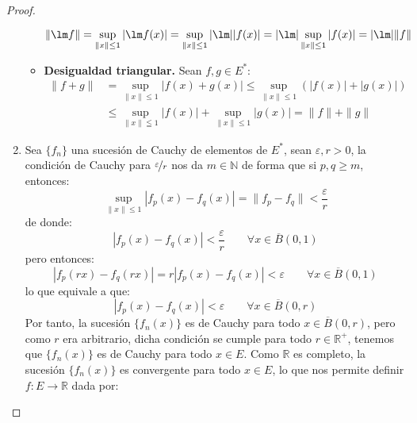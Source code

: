 \begin{prop}
\begin{proof}
\begin{enumerate}
\begin{itemize}
                        \begin{equation*}
                            \|\lm f\| = \sup_{\|x\|\leq 1} |\lm f(x)|  = \sup_{\|x\|\leq 1} |\lm||f(x)| = |\lm| \sup_{\|x\|\leq 1}|f(x)| = |\lm| \|f\|
                        \end{equation*}
                    \item \textbf{Desigualdad triangular.} Sean $f,g\in E^\ast$:
                        \begin{align*}
                            \|f+g\| &= \sup_{\|x\|\leq 1}|f(x) + g(x)| \leq \sup_{\|x\|\leq 1} (|f(x)| + |g(x)|) \\ &\leq \sup_{\|x\|\leqq 1}|f(x)| + \sup_{\|x\|\leq 1} |g(x)| = \|f\| + \|g\|
                        \end{align*}
                \end{itemize}
            \item Sea $\{f_n\}$ una sucesión de Cauchy de elementos de $E^\ast$, sean $\varepsilon,r>0$, la condición de Cauchy para $\nicefrac{\varepsilon}{r}$ nos da $m\in \mathbb{N}$ de forma que si $p,q\geq m$, entonces:
                \begin{equation*}
                    \sup_{\|x\|\leq 1} |f_p(x) - f_q(x)| = \|f_p - f_q\| < \dfrac{\varepsilon}{r}
                \end{equation*}
                de donde:
                \begin{equation*}
                    |f_p(x) - f_q(x)| < \dfrac{\varepsilon}{r}\qquad \forall x\in \overline{B}(0,1)
                \end{equation*}
                pero entonces:
                \begin{equation*}
                    |f_p(rx) - f_q(rx)| = r|f_p(x) - f_q(x)| < \varepsilon \qquad \forall x\in \overline{B}(0,1)
                \end{equation*}
                lo que equivale a que:
                \begin{equation*}
                    |f_p(x) - f_q(x)| < \varepsilon\qquad \forall x\in \overline{B}(0,r)
                \end{equation*}
                Por tanto, la sucesión $\{f_n(x)\}$ es de Cauchy para todo $x\in \overline{B}(0,r)$, pero como $r$ era arbitrario, dicha condición se cumple para todo $r\in \mathbb{R}^+$, tenemos que $\{f_n(x)\}$ es de Cauchy para todo $x\in E$. Como $\mathbb{R}$ es completo, la sucesión $\{f_n(x)\}$ es convergente para todo $x\in E$, lo que nos permite definir $f:E\to \mathbb{R}$ dada por:

\end{enumerate}
\end{proof}
\end{prop}
